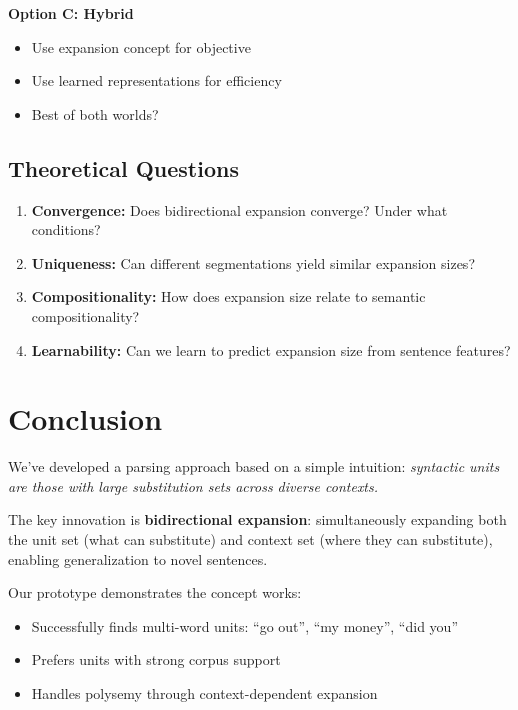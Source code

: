 \documentclass[11pt]{article}
\begin{document}
\textbf{Option C: Hybrid}
\begin{itemize}
\item Use expansion concept for objective
\item Use learned representations for efficiency
\item Best of both worlds?
\end{itemize}

\subsection{Theoretical Questions}

\begin{enumerate}
\item \textbf{Convergence:} Does bidirectional expansion converge? Under what conditions?

\item \textbf{Uniqueness:} Can different segmentations yield similar expansion sizes?

\item \textbf{Compositionality:} How does expansion size relate to semantic compositionality?

\item \textbf{Learnability:} Can we learn to predict expansion size from sentence features?
\end{enumerate}

\section{Conclusion}

We've developed a parsing approach based on a simple intuition: \emph{syntactic units are those with large substitution sets across diverse contexts.}

The key innovation is \textbf{bidirectional expansion}: simultaneously expanding both the unit set (what can substitute) and context set (where they can substitute), enabling generalization to novel sentences.

Our prototype demonstrates the concept works:
\begin{itemize}
\item Successfully finds multi-word units: ``go out'', ``my money'', ``did you''
\item Prefers units with strong corpus support
\item Handles polysemy through context-dependent expansion
\end{itemize}
\end{document}
